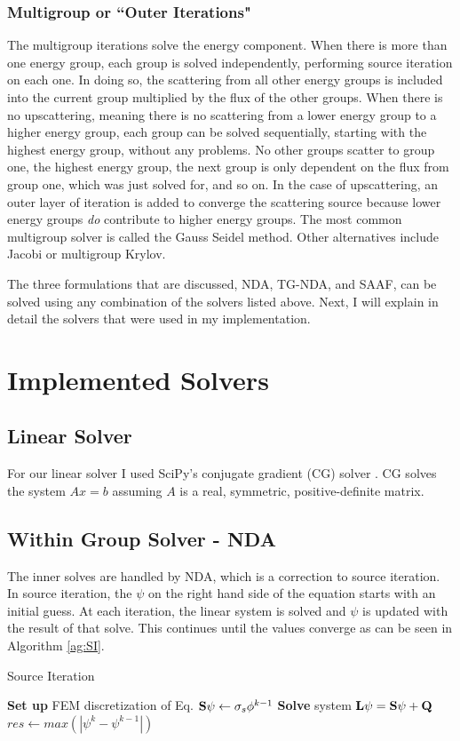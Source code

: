 \subsubsection{Multigroup or ``Outer Iterations"}
The multigroup iterations solve the energy component. When there is more than one energy group, each group is solved independently, performing source iteration on each one. In doing so, the scattering from all other energy groups is included into the current group multiplied by the flux of the other groups. When there is no upscattering, meaning there is no scattering from a lower energy group to a higher energy group, each group can be solved sequentially, starting with the highest energy group, without any problems. No other groups scatter to group one, the highest energy group, the next group is only dependent on the flux from group one, which was just solved for, and so on. In the case of upscattering, an outer layer of iteration is added to converge the scattering source because lower energy groups \textit{do} contribute to higher energy groups. The most common multigroup solver is called the Gauss Seidel method. Other alternatives include Jacobi or multigroup Krylov. 

The three formulations that are discussed, NDA, TG-NDA, and SAAF, can be solved using any combination of the solvers listed above. Next, I will explain in detail the solvers that were used in my implementation. 

\section{Implemented Solvers}
\subsection{Linear Solver}

For our linear solver I used SciPy's conjugate gradient (CG) solver \cite{SciPy} \cite{Shewchuck1994}. CG solves the system $Ax = b$ assuming $A$ is a real, symmetric, positive-definite matrix.

\subsection{Within Group Solver - NDA}
The inner solves are handled by NDA, which is a correction to source iteration. In source iteration, the $\psi$ on the right hand side of the equation starts with an initial guess. At each iteration, the linear system is solved and $\psi$ is updated with the result of that solve. This continues until the values converge as can be seen in Algorithm \ref{ag:SI}.
\begin{algorithm}
\caption{Source Iteration}
\begin{algorithmic}
 
    \State \textbf{Set up} FEM discretization of Eq.
    \State ${\bf S} \psi \gets \sigma_s \phi^{k-1}$ 
    \State \textbf{Solve} system $\textbf{L}\psi= {\bf S}\psi + {\bf Q}$
    \State $res \gets max(|\psi^{k} - \psi^{k-1}|)$
\EndWhile
\end{algorithmic}
\label{ag:SI}
\end{algorithm}


